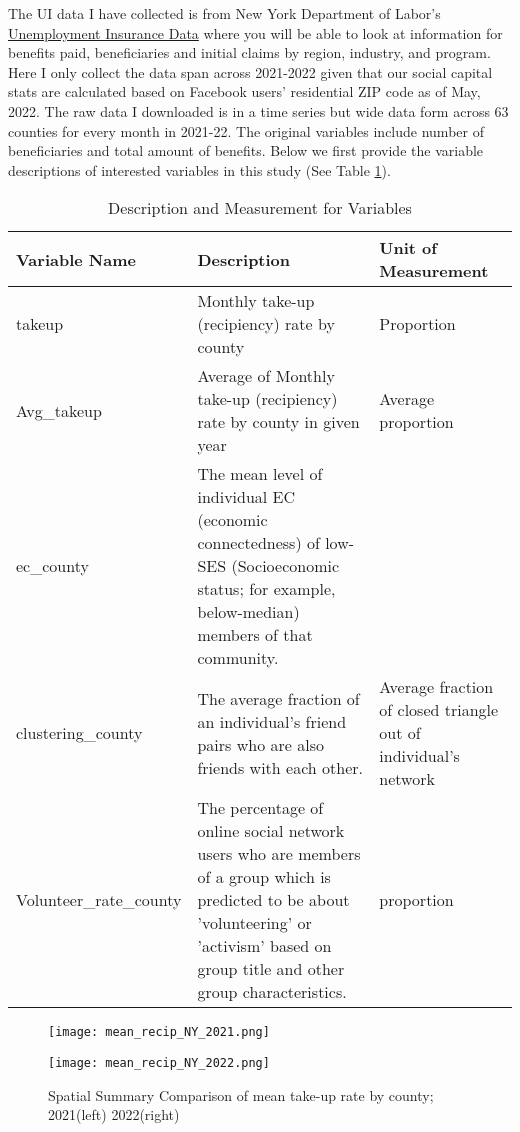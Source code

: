 \documentclass{article}
\begin{document}
The UI data I have collected is from New York Department of Labor's \href{https://dol.ny.gov/local-area-unemployment-statistics}{Unemployment Insurance Data} where you will be able to look at information for benefits paid, beneficiaries and initial claims by region, industry, and program. Here I only collect the data span across 2021-2022 given that our social capital stats are calculated based on Facebook users' residential ZIP code as of May, 2022. The raw data I downloaded is in a time series but wide data form across 63 counties for every month in 2021-22. The original variables include number of beneficiaries and total amount of benefits. Below we first provide the variable descriptions of interested variables in this study (See Table \ref{variable descr}).


\begin{table}[h]
\centering
\begin{tabular}{|p{3.2cm}|p{8cm}|p{4cm}|}
\hline
\textbf{Variable Name} & \textbf{Description} & \textbf{ Unit of Measurement} \\ \hline
takeup & Monthly take-up (recipiency) rate by county & Proportion  \\ \hline
Avg\_takeup & Average of Monthly take-up (recipiency) rate by county in given year & Average proportion \\ \hline
ec\_county & The mean level of individual EC (economic connectedness) of low-SES (Socioeconomic status; for example, below-median) members of that community. &  \\ \hline
clustering\_county & The average fraction of an individual's friend pairs who are also friends with each other. & Average fraction of closed triangle out of individual's network \\ \hline
Volunteer\_rate\_county & The percentage of online social network users who are members of a group which is predicted to be about 'volunteering' or 'activism' based on group title and other group characteristics. & proportion \\ \hline
\end{tabular}
\caption{Description and Measurement for Variables}
\label{variable descr}
\end{table}


\begin{figure}[h]
\begin{minipage}{0.5\textwidth}
    \centering
    \texttt{[image: mean\_recip\_NY\_2021.png]} %
  \end{minipage}\hfill
  \begin{minipage}{0.5\textwidth}
    \centering
    \texttt{[image: mean\_recip\_NY\_2022.png]} %
  \end{minipage}
  \caption{Spatial Summary Comparison of mean take-up rate by county; 2021(left) 2022(right)}
  \label{take-up figure}
\end{figure}
\end{document}
